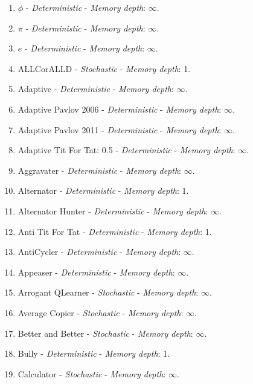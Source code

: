 \documentclass[10pt,letterpaper]{article}
\begin{document}
\begin{enumerate}
\item $\phi$ - \textit{Deterministic} - \textit{Memory depth}: \(\infty\). \cite{axelrodproject}
\item $\pi$ - \textit{Deterministic} - \textit{Memory depth}: \(\infty\). \cite{axelrodproject}
\item $e$ - \textit{Deterministic} - \textit{Memory depth}: \(\infty\). \cite{axelrodproject}
\item ALLCorALLD - \textit{Stochastic} - \textit{Memory depth}: 1. \cite{axelrodproject}
\item Adaptive - \textit{Deterministic} - \textit{Memory depth}: \(\infty\). \cite{Li2011}
\item Adaptive Pavlov 2006 - \textit{Deterministic} - \textit{Memory depth}: \(\infty\). \cite{kendall2007iterated}
\item Adaptive Pavlov 2011 - \textit{Deterministic} - \textit{Memory depth}: \(\infty\). \cite{Li2011}
\item Adaptive Tit For Tat: 0.5 - \textit{Deterministic} - \textit{Memory depth}: \(\infty\). \cite{Tzafestas2000}
\item Aggravater - \textit{Deterministic} - \textit{Memory depth}: \(\infty\). \cite{axelrodproject}
\item Alternator - \textit{Deterministic} - \textit{Memory depth}: 1. \cite{Axelrod1984, Mittal2009}
\item Alternator Hunter - \textit{Deterministic} - \textit{Memory depth}: \(\infty\). \cite{axelrodproject}
\item Anti Tit For Tat - \textit{Deterministic} - \textit{Memory depth}: 1. \cite{Hilbe2013}
\item AntiCycler - \textit{Deterministic} - \textit{Memory depth}: \(\infty\). \cite{axelrodproject}
\item Appeaser - \textit{Deterministic} - \textit{Memory depth}: \(\infty\). \cite{axelrodproject}
\item Arrogant QLearner - \textit{Stochastic} - \textit{Memory depth}: \(\infty\). \cite{axelrodproject}
\item Average Copier - \textit{Stochastic} - \textit{Memory depth}: \(\infty\). \cite{axelrodproject}
\item Better and Better - \textit{Stochastic} - \textit{Memory depth}: \(\infty\). \cite{Prison1998}
\item Bully - \textit{Deterministic} - \textit{Memory depth}: 1. \cite{Nachbar1992}
\item Calculator - \textit{Stochastic} - \textit{Memory depth}: \(\infty\). \cite{Prison1998}

\end{enumerate}
\end{document}
